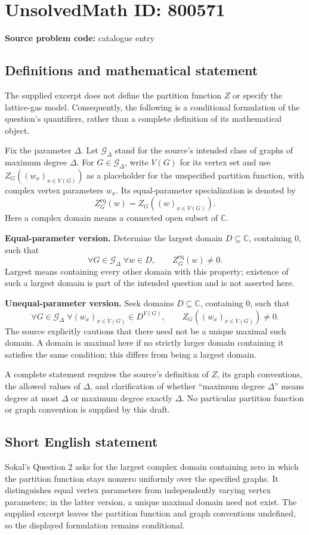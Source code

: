 \documentclass[11pt]{article}
\newcommand{\C}{\mathbb{C}}
\begin{document}
\section*{UnsolvedMath ID: 800571}
\textbf{Source problem code:} catalogue entry
\subsection{Definitions and mathematical statement}
The supplied excerpt does not define the partition function \(Z\) or specify the lattice-gas model. Consequently, the following is a conditional formulation of the question's quantifiers, rather than a complete definition of its mathematical object.

Fix the parameter \(\Delta\). Let \(\mathcal G_\Delta\) stand for the source's intended class of graphs of maximum degree \(\Delta\). For \(G\in\mathcal G_\Delta\), write \(V(G)\) for its vertex set and use \(Z_G((w_x)_{x\in V(G)})\) as a placeholder for the unspecified partition function, with complex vertex parameters \(w_x\). Its equal-parameter specialization is denoted by
\[
Z_G^{\mathrm{eq}}(w)=Z_G((w)_{x\in V(G)}).
\]
Here a complex domain means a connected open subset of \(\C\).

\textbf{Equal-parameter version.} Determine the largest domain \(D\subseteq\C\), containing \(0\), such that
\[
\forall G\in\mathcal G_\Delta\;\forall w\in D,
\qquad Z_G^{\mathrm{eq}}(w)\ne0.
\]
Largest means containing every other domain with this property; existence of such a largest domain is part of the intended question and is not asserted here.

\textbf{Unequal-parameter version.} Seek domains \(D\subseteq\C\), containing \(0\), such that
\[
\forall G\in\mathcal G_\Delta\;\forall (w_x)_{x\in V(G)}\in D^{V(G)},
\qquad Z_G((w_x)_{x\in V(G)})\ne0.
\]
The source explicitly cautions that there need not be a unique maximal such domain. A domain is maximal here if no strictly larger domain containing it satisfies the same condition; this differs from being a largest domain.

A complete statement requires the source's definition of \(Z\), its graph conventions, the allowed values of \(\Delta\), and clarification of whether ``maximum degree \(\Delta\)'' means degree at most \(\Delta\) or maximum degree exactly \(\Delta\). No particular partition function or graph convention is supplied by this draft.
\subsection{Short English statement}
Sokal's Question 2 asks for the largest complex domain containing zero in which the partition function stays nonzero uniformly over the specified graphs. It distinguishes equal vertex parameters from independently varying vertex parameters; in the latter version, a unique maximal domain need not exist. The supplied excerpt leaves the partition function and graph conventions undefined, so the displayed formulation remains conditional.
\end{document}
